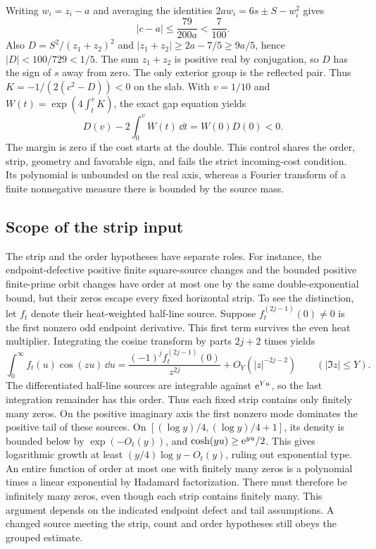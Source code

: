 Writing \(w_i=z_i-a\) and averaging the identities
\(2aw_i=6s\pm S-w_i^2\) gives
\[
 |c-a|\le \frac{79}{200a}<\frac7{100}.
\]
Also \(D=S^2/(z_1+z_2)^2\) and
\(|z_1+z_2|\ge2a-7/5\ge9a/5\), hence
\(|D|<100/729<1/5\). The sum \(z_1+z_2\) is positive real by
conjugation, so \(D\) has the sign of \(s\) away from zero.
The only exterior group is the reflected pair. Thus
\(K=-1/(2(c^2-D))<0\) on the slab. With \(v=1/10\) and
\(W(t)=\exp(4\int_t^v K)\), the exact gap equation yields
\[
 D(v)-2\int_0^v W(t)\,\dd t=W(0)D(0)<0 .
\]
The margin is zero if the cost starts at the double. This control
shares the order, strip, geometry and favorable sign, and fails the
strict incoming-cost condition. Its polynomial is unbounded on the
real axis, whereas a Fourier transform of a finite nonnegative
measure there is bounded by the source mass.

\subsection{Scope of the strip input}

The strip and the order hypotheses have separate roles. For instance,
the endpoint-defective positive finite square-source changes and the
bounded positive finite-prime orbit changes have order at most one
by the same double-exponential bound, but their zeros escape every
fixed horizontal strip. To see the distinction, let \(f_t\) denote
their heat-weighted half-line source. Suppose \(f_t^{(2j-1)}(0)\ne0\)
is the first nonzero odd endpoint derivative. This first term
survives the even heat multiplier. Integrating the cosine transform by
parts \(2j+2\) times yields
\[
 \int_0^\infty f_t(u)\cos(zu)\,\dd u
 =\frac{(-1)^j f_t^{(2j-1)}(0)}{z^{2j}}
    +O_Y(|z|^{-2j-2}) \qquad (|\Im z|\le Y).
\]
The differentiated half-line sources are integrable against
\(\mathrm e^{Yu}\), so the last integration remainder has this order.
Thus each fixed strip contains only finitely many zeros. On the
positive imaginary axis the first nonzero mode dominates the positive
tail of these sources. On
\([(\log y)/4,(\log y)/4+1]\), its density is bounded below by
\(\exp(-O_t(y))\), and \(\cosh(yu)\ge\mathrm e^{yu}/2\).
This gives logarithmic growth at least
\((y/4)\log y-O_t(y)\), ruling out exponential type. An entire
function of order at most one with finitely many zeros is a polynomial
times a linear exponential by Hadamard factorization. There must
therefore be infinitely many zeros, even though each strip contains
finitely many. This argument depends on the indicated endpoint
defect and tail assumptions. A changed source meeting the strip,
count and order hypotheses still obeys the grouped estimate.


